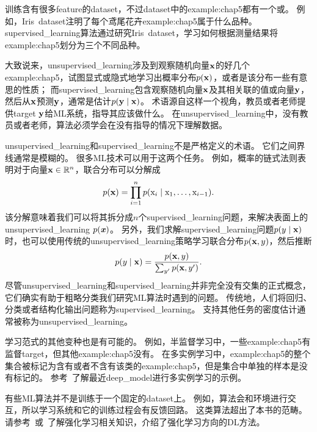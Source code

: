 训练含有很多\gls{feature}的\gls{dataset}，不过\gls{dataset}中的\gls{example:chap5}都有一个或。
例如，Iris~\gls{dataset}注明了每个鸢尾花卉\gls{example:chap5}属于什么品种。
\gls{supervised_learning}算法通过研究Iris~\gls{dataset}，学习如何根据测量结果将\gls{example:chap5}划分为三个不同品种。

大致说来，\gls{unsupervised_learning}涉及到观察随机向量$\mathbf{x}$的好几个\gls{example:chap5}，试图显式或隐式地学习出概率分布$p(\mathbf{x})$，或者是该分布一些有意思的性质；
而\gls{supervised_learning}包含观察随机向量$\mathbf{x}$及其相关联的值或向量$\mathbf{y}$，然后从$\mathbf{x}$预测$\mathbf{y}$，通常是估计$p(\mathbf{y}\mid\mathbf{x})$。
术语源自这样一个视角，教员或者老师提供\gls{target} $\mathbf{y}$给\gls{ML}系统，指导其应该做什么。
在\gls{unsupervised_learning}中，没有教员或者老师，算法必须学会在没有指导的情况下理解数据。

\gls{unsupervised_learning}和\gls{supervised_learning}不是严格定义的术语。
它们之间界线通常是模糊的。
很多\gls{ML}技术可以用于这两个任务。
例如，概率的链式法则表明对于向量$\mathbf{x}\in\mathbb{R}^n$，联合分布可以分解成
\begin{equation}
    p(\mathbf{x}) = \prod_{i=1}^n p(\mathrm{x}_i \mid \mathrm{x}_1,\dots,\mathrm{x}_{i-1}) .
\end{equation}
该分解意味着我们可以将其拆分成$n$个\gls{supervised_learning}问题，来解决表面上的\gls{unsupervised_learning} $p(\boldsymbol{\mathit{x}})$。
另外，我们求解\gls{supervised_learning}问题$p(y\mid\mathbf{x})$时，也可以使用传统的\gls{unsupervised_learning}策略学习联合分布$p(\mathbf{x},y)$，然后推断
\begin{equation}
    p(y\mid\mathbf{x}) = \frac{p(\mathbf{x},y)}{\sum_{y'}p(\mathbf{x},y')}.
\end{equation}
尽管\gls{unsupervised_learning}和\gls{supervised_learning}并非完全没有交集的正式概念，它们确实有助于粗略分类我们研究\gls{ML}算法时遇到的问题。
传统地，人们将回归、分类或者结构化输出问题称为\gls{supervised_learning}。
支持其他任务的密度估计通常被称为\gls{unsupervised_learning}。


学习范式的其他变种也是有可能的。
例如，半监督学习中，一些\gls{example:chap5}有监督\gls{target}，但其他\gls{example:chap5}没有。
在多实例学习中，\gls{example:chap5}的整个集合被标记为含有或者不含有该类的\gls{example:chap5}，但是集合中单独的样本是没有标记的。
参考~\cite{Kotzias2015}了解最近\gls{deep_model}进行多实例学习的示例。

有些\gls{ML}算法并不是训练于一个固定的\gls{dataset}上。
例如，算法会和环境进行交互，所以学习系统和它的训练过程会有反馈回路。
这类算法超出了本书的范畴。
请参考~\cite{Sutton+Barto-98}或~\cite{Bertsekas+Tsitsiklis-book1996}了解强化学习相关知识，\cite{Mnih2013}介绍了强化学习方向的\gls{DL}方法。

